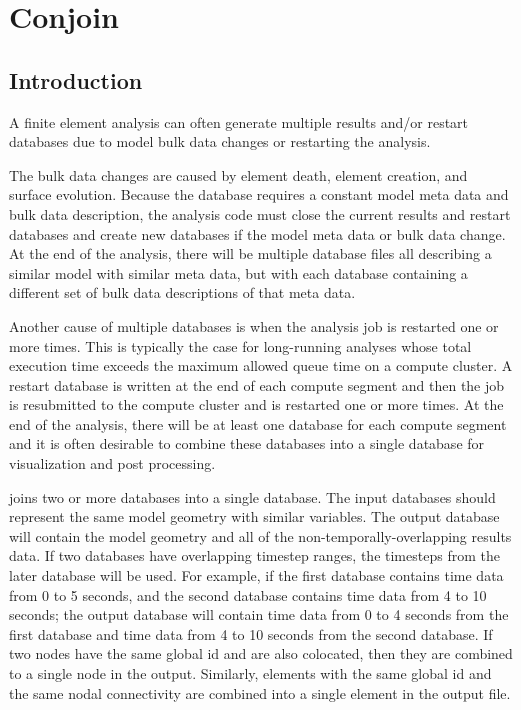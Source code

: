 \chapter{Conjoin}\label{ch:conjoin}
\section{Introduction}
A finite element analysis can often generate multiple results and/or
restart databases due to model bulk data changes or restarting the
analysis.

The bulk data changes are caused by element death, element creation,
and surface evolution.  Because the \exo{} database requires a
constant model meta data and bulk data description, the analysis code
must close the current results and restart databases and create new
databases if the model meta data or bulk data change. At the end of
the analysis, there will be multiple database files all describing a
similar model with similar meta data, but with each database
containing a different set of bulk data descriptions of that meta
data.

Another cause of multiple \exo{} databases is when the analysis job is
restarted one or more times.  This is typically the case for
long-running analyses whose total execution time exceeds the maximum
allowed queue time on a compute cluster.  A restart database is
written at the end of each compute segment and then the job is
resubmitted to the compute cluster and is restarted one or more
times. At the end of the analysis, there will be at least one database
for each compute segment and it is often desirable to combine these
databases into a single database for visualization and post processing.

\conjoin{} joins two or more \exo{} databases into a single
database. The input databases should represent the same model geometry
with similar variables. The output database will contain the model
geometry and all of the non-temporally-overlapping results data. If
two databases have overlapping timestep ranges, the timesteps from the
later database will be used. For example, if the first database
contains time data from 0 to 5 seconds, and the second database
contains time data from 4 to 10 seconds; the output database will
contain time data from 0 to 4 seconds from the first database and time
data from 4 to 10 seconds from the second database.  If two nodes have
the same global id and are also colocated, then they are combined to a
single node in the output. Similarly, elements with the same global id
and the same nodal connectivity are combined into a single element in
the output file.

